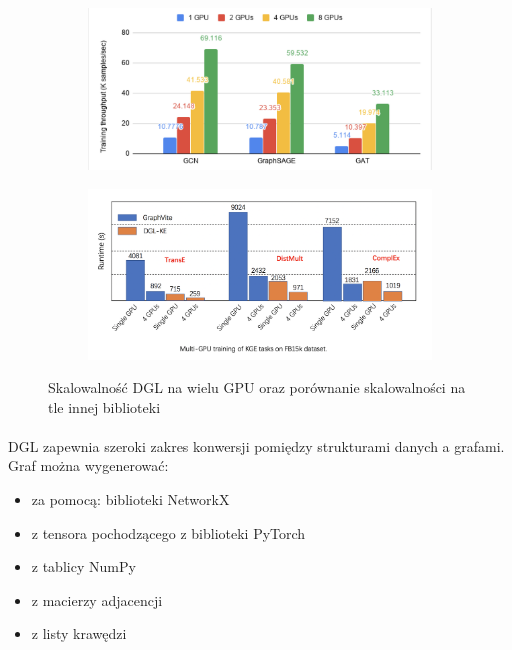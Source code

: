 \documentclass{article}
\begin{document}
\begin{figure}[h]
\centering
\begin{subfigure}{.5\textwidth}
  \centering
  \includegraphics[width=0.9\linewidth]{images/one-four-GPUs}
  \label{fig:sub1}
\end{subfigure}%
\begin{subfigure}{.5\textwidth}
  \centering
  \includegraphics[width=0.9\linewidth]{images/one-four-GPUs-DGLvsGraphVite}
  \label{fig:sub2}
\end{subfigure}
\caption{Skalowalność DGL na wielu GPU oraz porównanie skalowalności na tle innej biblioteki}
\label{fig:test}
\end{figure}

\paragraph{}

DGL zapewnia szeroki zakres konwersji pomiędzy strukturami danych a grafami. Graf można wygenerować:
\begin{itemize}
    \item
    za pomocą: biblioteki NetworkX
    \item
    z tensora pochodzącego z biblioteki PyTorch
    \item
    z tablicy NumPy
    \item
    z macierzy adjacencji
    \item
    z listy krawędzi
\end{itemize}
\end{document}
